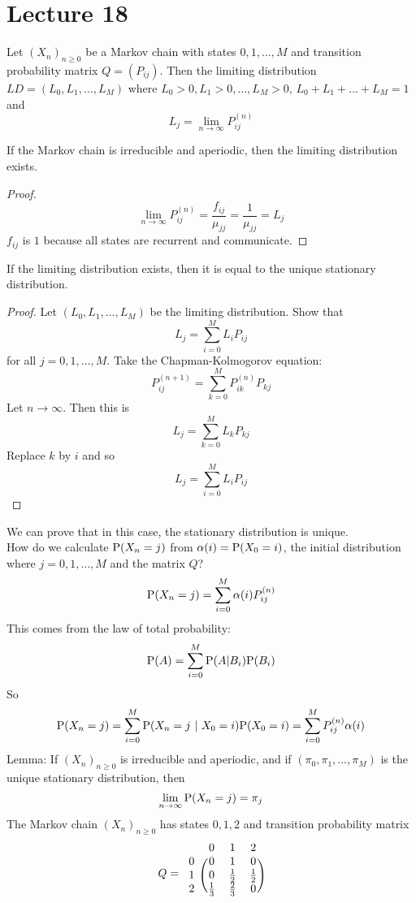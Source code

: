 \documentclass[12pt]{article}
\begin{document}
\section{Lecture 18} 
Let $(X_n)_{n\geq0}$ be a Markov chain with states $0,1,\dots,M$ and transition probability matrix $Q = (P_{ij})$. Then the limiting distribution $LD = (L_0, L_1,\dots,L_M)$ where $L_0 > 0, L_1 > 0,\dots, L_M > 0$, $L_0 + L_1 + \dots + L_M = 1$ and $$L_j = \lim_{n\to\infty} P_{ij}^{(n)} $$ 
\begin{theorem} If the Markov chain is irreducible and aperiodic, then the limiting distribution exists. \end{theorem} 
\begin{proof} $$ \lim_{n\to\infty} P_{ij}^{(n)} = \frac{f_{ij}}{\mu_{jj}} = \frac{1}{\mu_{jj}} = L_j $$ $f_{ij}$ is $1$ because all states are recurrent and communicate. \end{proof} 
\begin{theorem} If the limiting distribution exists, then it is equal to the unique stationary distribution. \end{theorem} 
\begin{proof} Let $(L_0,L_1,\dots,L_M)$ be the limiting distribution. Show that $$L_j = \sum_{i=0}^M L_iP_{ij} $$ for all $j = 0,1,\dots,M$. Take the Chapman-Kolmogorov equation: $$ P_{ij}^{(n+1)} = \sum_{k=0}^M P_{ik}^{(n)}P_{kj} $$ Let $n \to \infty$. Then this is $$ L_j = \sum_{k=0}^M L_k P_{kj} $$ Replace $k$ by $i$ and so $$ L_j = \sum_{i=0}^M L_iP_{ij} $$ \end{proof} 
We can prove that in this case, the stationary distribution is unique. \\
How do we calculate $\mathrm{P}( X_n = j )$ from $\alpha(i) = \mathrm{P}( X_0 = i )$, the initial distribution where $j = 0,1,\dots,M$ and the matrix $Q$? $$ \mathrm{P}( X_n = j ) = \sum_{i=0}^M \alpha(i)P_{ij}^{(n)} $$ 
This comes from the law of total probability: $$ \mathrm{P}( A ) = \sum_{i=0}^M \mathrm{P}( A | B_i )\mathrm{P}( B_i ) $$ 
So $$ \mathrm{P}( X_n = j ) = \sum_{i=0}^M \mathrm{P}( X_n = j ~|~ X_0 = i )\mathrm{P}( X_0 = i ) = \sum_{i=0}^M P_{ij}^{(n)}\alpha(i) $$ 
Lemma: If $(X_n)_{n\geq0}$ is irreducible and aperiodic, and if $(\pi_0,\pi_1,\dots,\pi_M)$ is the unique stationary distribution, then $$ \lim_{n\to\infty} \mathrm{P}( X_n = j ) = \pi_j $$ 
The Markov chain $(X_n)_{n\geq0}$ has states $0,1,2$ and transition probability matrix $$ Q = \begin{blockarray}{cccc}
&0&1&2 \\
\begin{block}{c(ccc)}
0 & 0 & 1 & 0  \\
1 & 0 & \frac{1}{2} & \frac{1}{2}  \\ 
2 & \frac{1}{3} & \frac{2}{3} & 0  \\  \end{block} \end{blockarray} $$
\end{document}
